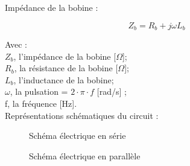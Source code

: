 Impédance de la bobine : 

\begin{equation}
    Z_b = R_b + j \omega L_b
\end{equation}

Avec : \\
$Z_b$, l'impédance de la bobine [$\Omega$];\\
$R_b$, la résistance de la bobine [$\Omega$];\\
$L_b$, l'inductance de la bobine;\\
$\omega$, la pulsation = $ 2 \cdot \pi \cdot f$ [rad/s] ;\\
f, la fréquence [Hz].\\

Représentations schématiques du circuit : 

\begin{figure}[H]
    \begin{minipage}[c]{.50\linewidth}
        \centering
        \caption{Schéma électrique en série}
    \label{fig:SCH1}
    \end{minipage}
    \hfill%
    \begin{minipage}[c]{.50\linewidth}
        \centering
        \caption{Schéma électrique en parallèle}
    \label{fig:SCH2}
    \end{minipage}
\end{figure}

